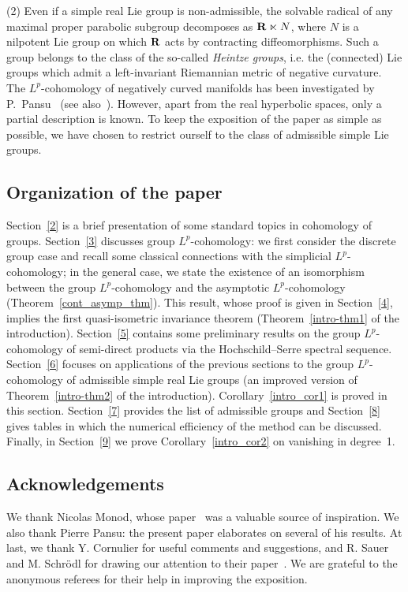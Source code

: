 (2) Even if a simple real Lie group is non-admissible, the solvable radical of any maximal proper parabolic subgroup decomposes as ${\bf R} \ltimes N$, where $N$ is a nilpotent Lie group on which ${\bf R}$ acts by contracting diffeomorphisms. Such a group belongs to the class of the so-called \emph{Heintze groups}, i.e. the (connected) Lie groups which admit a left-invariant Riemannian metric of negative curvature. The $L^p$-cohomology of negatively curved manifolds has been investigated by P.~Pansu~\cite{P1, Pa99} (see also~\cite{B16}). However, apart from the real hyperbolic spaces, only a partial description is known. To keep the exposition of the paper as simple as possible, we have chosen to restrict ourself to the class of admissible simple Lie groups.



\subsection*{Organization of the paper}
Section~\ref{2} is a brief presentation of some standard topics in cohomology of groups. Section~\ref{3} discusses group $L^p$-cohomology: we first consider the discrete group case and recall some classical connections with the simplicial $L^p$-cohomology; in the general case, we state the existence of an isomorphism between the group $L^p$-cohomology and the asymptotic $L^p$-cohomology (Theorem~\ref{cont_asymp_thm}). This result, whose proof is given in Section~\ref{4}, implies the first quasi-isometric invariance theorem (Theorem~\ref{intro-thm1} of the introduction). Section~\ref{5} contains some preliminary results on the group $L^p$-cohomology of semi-direct products via the Hochschild--Serre spectral sequence. Section~\ref{6} focuses on applications of the previous sections to the group $L^p$-cohomology of admissible simple real Lie groups (an improved version of Theorem~\ref{intro-thm2} of the introduction). Corollary~\ref{intro_cor1} is proved in this section. Section~\ref{7} provides the list of admissible groups and Section~\ref{8} gives tables in which the numerical efficiency of the method can be discussed. Finally, in Section~\ref{9} we prove Corollary~\ref{intro_cor2} on vanishing in degree~1.

\subsection*{Acknowledgements}
We thank Nicolas Monod, whose paper~\cite{Monod} was a valuable source of inspiration. We also thank Pierre Pansu: the present paper elaborates on several of his results. At last, we thank Y. Cornulier for useful comments and suggestions, and R. Sauer and M. Schr\"odl for drawing our attention to their paper~\cite{SaSc}. We are grateful to the anonymous referees for their help in improving the exposition.


